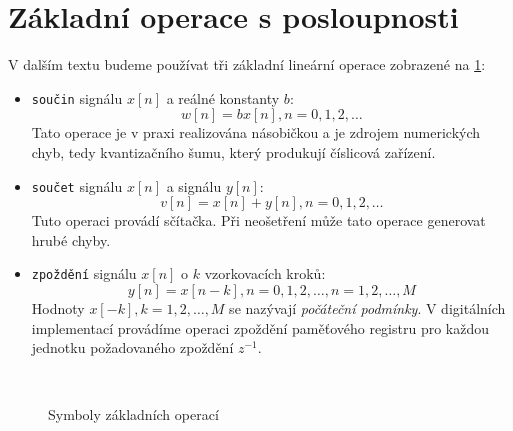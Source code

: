   \section{Základní operace s posloupnosti}
    V dalším textu budeme používat tři základní lineární operace zobrazené na \ref{ces:fig048}:
    \begin{itemize}
      \item \texttt{součin} signálu $x[n]$ a reálné konstanty $b$:
            $$w[n]=bx[n], n = 0,1,2, \ldots$$ Tato operace je v praxi realizována násobičkou a je
            zdrojem numerických chyb, tedy kvantizačního šumu, který produkují číslicová zařízení.
      \item \texttt{součet} signálu $x[n]$ a signálu $y[n]$:
            $$v[n]=x[n]+y[n], n = 0,1,2, \ldots$$ Tuto operaci provádí sčítačka. Při neošetření může
            tato operace generovat hrubé chyby.
      \item \texttt{zpoždění} signálu $x[n]$ o $k$ vzorkovacích kroků:  
            $$y[n]=x[n-k], n = 0,1,2, \ldots, n = 1,2, \ldots, M $$  Hodnoty $x[-k], k = 1, 2,
            \ldots, M$ se nazývají \emph{počáteční podmínky}. V digitálních implementací provádíme
            operaci zpoždění paměťového registru pro každou jednotku požadovaného zpoždění $z^{-1}$.
    \end{itemize}

    \begin{figure}[ht!]
      \centering
        \\
      \caption[Základní operace]{Symboly základních operací \cite[s.~7]{Sovka2002}} 
      \label{ces:fig048}
    \end{figure}